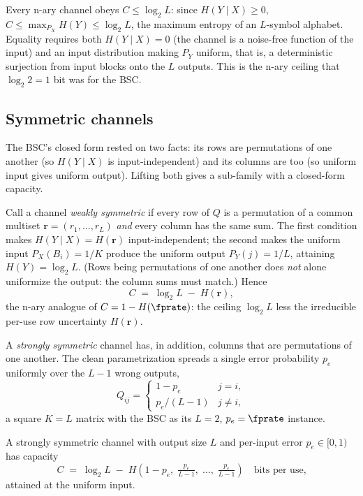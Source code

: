 \begin{remark}
\label{rem:capacity-bound}
Every n-ary channel obeys $C \le \log_2 L$: since $H(Y \mid X) \ge 0$,
$C \le \max_{P_X} H(Y) \le \log_2 L$, the maximum entropy of an $L$-symbol
alphabet. Equality requires both $H(Y \mid X) = 0$ (the channel is a noise-free
function of the input) and an input distribution making $P_Y$ uniform, that is,
a deterministic surjection from input blocks onto the $L$ outputs. This is the
n-ary ceiling that $\log_2 2 = 1$ bit was for the BSC.
\end{remark}

\subsection*{Symmetric channels}

The BSC's closed form rested on two facts: its rows are permutations of one
another (so $H(Y \mid X)$ is input-independent) and its columns are too (so
uniform input gives uniform output). Lifting both gives a sub-family with a
closed-form capacity.

Call a channel \emph{weakly symmetric} if every row of $Q$ is a permutation of a
common multiset $\mathbf{r} = (r_1, \ldots, r_L)$ \emph{and} every column has the
same sum. The first condition makes $H(Y \mid X) = H(\mathbf{r})$
input-independent; the second makes the uniform input $P_X(B_i) = 1/K$ produce
the uniform output $P_Y(j) = 1/L$, attaining $H(Y) = \log_2 L$. (Rows being
permutations of one another does \emph{not} alone uniformize the output: the
column sums must match.) Hence
\begin{equation}
\label{eq:symmetric-capacity}
  C \;=\; \log_2 L \;-\; H(\mathbf{r}),
\end{equation}
the n-ary analogue of $C = 1 - H(\fprate)$: the ceiling $\log_2 L$ less the
irreducible per-use row uncertainty $H(\mathbf{r})$.

A \emph{strongly symmetric} channel has, in addition, columns that are
permutations of one another. The clean parametrization spreads a single error
probability $p_e$ uniformly over the $L - 1$ wrong outputs,
\[
  Q_{ij} =
  \begin{cases}
    1 - p_e & j = i, \\
    p_e/(L - 1) & j \neq i,
  \end{cases}
\]
a square $K = L$ matrix with the BSC as its $L = 2$, $p_e = \fprate$ instance.

\begin{proposition}
\label{prop:n-ary-capacity}
A strongly symmetric channel with output size $L$ and per-input error $p_e \in
[0, 1)$ has capacity
\begin{equation}
\label{eq:strongly-symmetric-capacity}
  C \;=\; \log_2 L \;-\; H\!\left(1 - p_e,\; \tfrac{p_e}{L-1},\; \ldots,\;
          \tfrac{p_e}{L-1}\right)
  \quad \text{bits per use,}
\end{equation}
attained at the uniform input.
\end{proposition}

